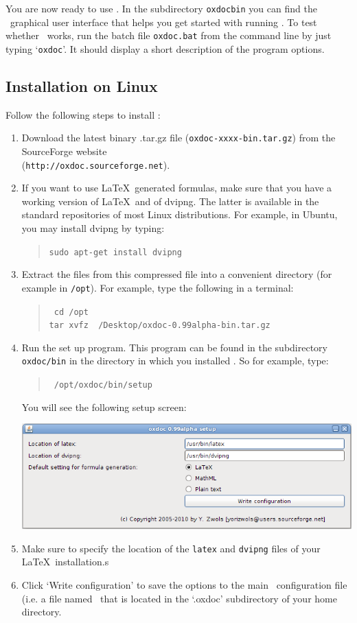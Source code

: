 You are now ready to use \oxdoc. In the subdirectory {\tt oxdoc\bs bin}
you can find the \oxdoc~graphical user interface that helps you get started
with running \oxdoc. 
To test whether \oxdoc~works, run the batch file {\tt oxdoc.bat} from the command line
by just typing `{\tt oxdoc}'.  It should 
display a short description of the program options.






\subsection{Installation on Linux}
Follow the following steps to install \oxdoc:
\begin{enumerate}
\item Download the latest binary .tar.gz file ({\tt oxdoc-xxxx-bin.tar.gz}) from
the SourceForge website \\({\tt http://oxdoc.sourceforge.net}). 
\item If you want to use \LaTeX~generated formulas, make sure that you have a working
version of \LaTeX~and of dvipng. The latter is available in the standard repositories of most Linux distributions.
For example, in Ubuntu, you may install dvipng by typing:
\begin{quote}
\tt sudo apt-get install dvipng
\end{quote}
\item Extract the files from this compressed file into a convenient directory
(for example in {\tt /opt}). For example, type the following in a terminal:
\begin{quote} \tt
cd /opt\\
tar xvfz ~/Desktop/oxdoc-0.99alpha-bin.tar.gz
\end{quote}
\item Run the set up program. This program can be found in the subdirectory {\tt oxdoc/bin}
in the directory in which you installed \oxdoc. So for example, type:
\begin{quote} \tt
/opt/oxdoc/bin/setup
\end{quote}
You will see the following setup screen:
\begin{center}
\includegraphics[scale=0.5]{setup_linux.png}
\end{center}
\item Make sure to specify the location of the {\tt latex} and {\tt dvipng} files
of your \LaTeX~installation.s
\item Click `Write configuration' to save the options to the main \oxdoc~configuration file
(i.e. a file named \oxdocxml~that is located in the `.oxdoc' subdirectory of your home directory.
\end{enumerate}

